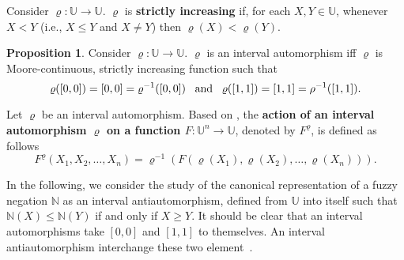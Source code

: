 \documentclass[12pt]{article}
\theoremstyle{plain}
\newtheorem{theorem}{Theorem}[section]
\theoremstyle{remark}
\theoremstyle{definition}
\theoremstyle{proposition}
\newtheorem{proposition}[theorem]{Proposition}
\newcommand{\UU}{\mathbb{U} }
\begin{document}
Consider $\varrho:\UU\rightarrow \UU$. $\varrho$ is {\bf strictly
increasing} if, for each $X,Y\in \UU$, whenever $X< Y$ (i.e.,
$X\leq Y$ and $X\neq Y$) then $\varrho(X)<\varrho(Y)$.

\begin{proposition}\cite[Proposition 5.1]{BT06a}
Consider $\varrho:\UU\rightarrow \UU$. $\varrho$ is  an interval
automorphism iff $\varrho$ is Moore-continuous, strictly
increasing function such that
\begin{equation}\label{eq-extrem-auto}
\varrho([0,0])=[0,0] = \varrho^{-1}([0,0]) \mbox{\,\,\, and \,\,\,} \varrho([1,1])=[1,1]=\rho^{-1}([1,1]).
\end{equation}
\end{proposition}
%
%
%



Let $\varrho$ be an interval automorphism. Based on
\cite{BT06a,BDSR10}, the \textbf{action of an interval
automorphism $\varrho$ on a function $F: \mathbb{U}^{n}\rightarrow
\mathbb{U}$}, denoted by $F^{\varrho}$, is defined as follows
\begin{equation} \label{eq-aut-imp-int}
F^\varrho(X_1,X_2, \ldots
,X_n)=\varrho^{-1}(F(\varrho(X_1),\varrho(X_2), \ldots
,\varrho(X_n))).
\end{equation}

In the following, we consider the study of the canonical
representation of a fuzzy negation $\mathbb{N}$ as an interval
antiautomorphism, defined from $\mathbb{U}$ into itself such that
$\mathbb{N}(X)\leq \mathbb{N}(Y)$ if and only if $X \geq Y$. It
should be clear that an interval automorphisms take $[0,0]$ and
$[1,1]$ to themselves. An interval antiautomorphism interchange
these two element~\cite{Ngu06}.
\end{document}
